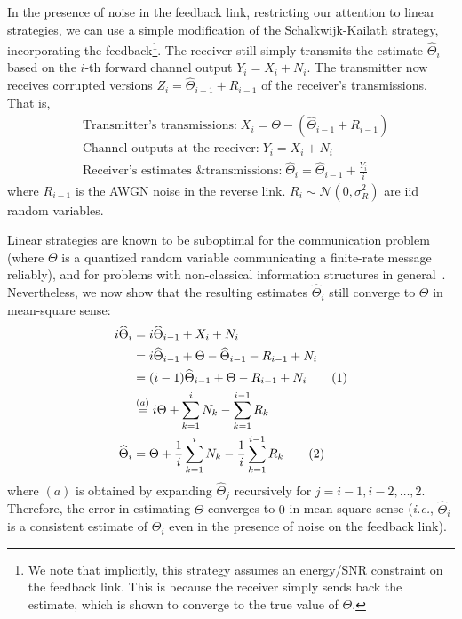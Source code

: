\documentclass[letterpaper, 10pt, conference]{ieeeconf}
\newcommand\numberthis{\stepcounter{equation}\tag{\theequation}}
\begin{document}
In the presence of noise in the feedback link, restricting our attention to linear strategies, we can use a simple modification of the Schalkwijk-Kailath strategy, incorporating the feedback\footnote{We note that implicitly, this strategy assumes an energy/SNR constraint on the feedback link. This is because the receiver simply sends back the estimate, which is shown to converge to the true value of $\Theta$.}. The receiver still simply transmits the estimate $\widehat{\Theta}_i$ based on the $i$-th forward channel output $Y_i=X_i+N_i$. The transmitter now receives corrupted versions $Z_i=\widehat\Theta_{i-1} + R_{i-1}$ of the receiver's transmissions. That is,
\begin{align}
	& \text{Transmitter's transmissions:}\;X_i = \Theta - (\widehat\Theta_{i-1} + R_{i-1}) \\ \label{eq:noisy-tx-x}
	& \text{Channel outputs at the receiver:}\;	Y_i = X_i + N_i \\
	& \text{Receiver's estimates \& transmissions:}\;	\widehat\Theta_i = \widehat\Theta_{i-1} + \frac{Y_i}{i}
\end{align}
where $R_{i-1}$ is the AWGN noise in the reverse link. $R_i \sim \mathcal{N}(0, \sigma_R^2)$ are iid random variables.

Linear strategies are known to be suboptimal for the communication problem~\cite{YoungHanKimPaper} (where $\Theta$ is a quantized random variable communicating a finite-rate message reliably), and for problems with non-classical information structures in general~\cite{Witsenhausen68}. Nevertheless, we now show that the resulting estimates $\widehat{\Theta}_i$  still converge to $\Theta$ in mean-square sense:
\begin{align*}
	i\widehat\Theta_i &= i\widehat\Theta_{i-1} + X_i + N_i \\
					  &= i\widehat\Theta_{i-1} + \Theta - \widehat\Theta_{i-1} - R_{i-1} + N_i \\
					  &= (i-1) \widehat\Theta_{i-1} + \Theta - R_{i-1} + N_i \numberthis \label{eq:theta_hat_i-noisy-once} \\
					  &\overset{(a)}{=} i\Theta + \sum_{k=1}^i N_k - \sum_{k=1}^{i-1} R_k \\
	\widehat\Theta_i  &= \Theta + \frac{1}{i} \sum_{k=1}^i N_k - \frac{1}{i} \sum_{k=1}^{i-1} R_k \numberthis \label{eq:theta_hat_i-noisy}
\end{align*}
where $(a)$ is obtained by expanding $\widehat{\Theta}_j$ recursively for $j=i-1,i-2,\ldots,2$. Therefore, the error in estimating $\Theta$ converges to $0$ in mean-square sense (\textit{i.e.}, $\widehat{\Theta}_i$ is a consistent estimate of $\Theta_i$ even in the presence of noise on the feedback link).
\end{document}
